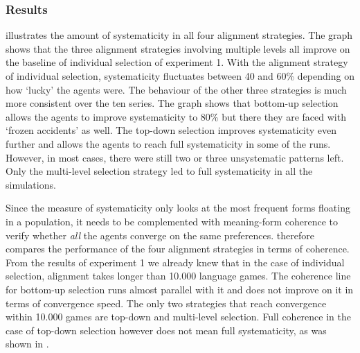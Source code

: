 \subsubsection{Results}
  illustrates the amount of systematicity in all four alignment strategies. The graph shows that the three alignment strategies involving multiple levels all improve on the baseline of individual selection of experiment 1. With the alignment strategy of individual selection, systematicity fluctuates between 40 and 60\% depending on how `lucky' the agents were. The behaviour of the other three strategies is much more consistent over the ten series. The graph shows that bottom-up selection allows the agents to improve systematicity to 80\% but there they are faced with `frozen accidents' as well. The top-down selection improves systematicity even further and allows the agents to reach full systematicity in some of the runs. However, in most cases, there were still two or three unsystematic patterns left. Only the multi-level selection strategy led to full systematicity in all the simulations.

Since the measure of systematicity only looks at the most frequent forms floating in a population, it needs to be complemented with meaning-form coherence to verify whether {\em all} the agents converge on the same preferences.  therefore compares the performance of the four alignment strategies in terms of coherence. From the results of experiment 1 we already knew that in the case of individual selection, alignment takes longer than 10.000 language games. The coherence line for bottom-up selection runs almost parallel with it and does not improve on it in terms of convergence speed. The only two strategies that reach convergence within 10.000 games are top-down and multi-level selection. Full coherence in the case of top-down selection however does not mean full systematicity, as was shown in .


